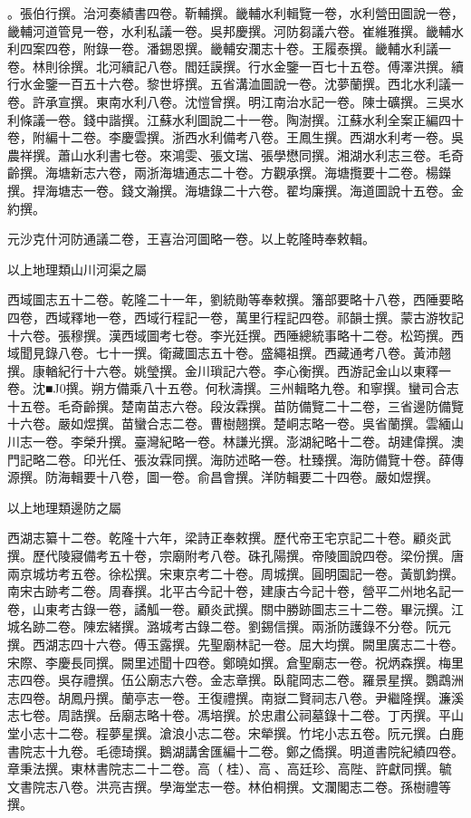\begin{pinyinscope}
。張伯行撰。治河奏績書四卷。靳輔撰。畿輔水利輯覽一卷，水利營田圖說一卷，畿輔河道管見一卷，水利私議一卷。吳邦慶撰。河防芻議六卷。崔維雅撰。畿輔水利四案四卷，附錄一卷。潘錫恩撰。畿輔安瀾志十卷。王履泰撰。畿輔水利議一卷。林則徐撰。北河續記八卷。閻廷謨撰。行水金鑒一百七十五卷。傅澤洪撰。續行水金鑒一百五十六卷。黎世垿撰。五省溝洫圖說一卷。沈夢蘭撰。西北水利議一卷。許承宣撰。東南水利八卷。沈愷曾撰。明江南治水記一卷。陳士礦撰。三吳水利條議一卷。錢中諧撰。江蘇水利圖說二十一卷。陶澍撰。江蘇水利全案正編四十卷，附編十二卷。李慶雲撰。浙西水利備考八卷。王鳳生撰。西湖水利考一卷。吳農祥撰。蕭山水利書七卷。來鴻雯、張文瑞、張學懋同撰。湘湖水利志三卷。毛奇齡撰。海塘新志六卷，兩浙海塘通志二十卷。方觀承撰。海塘攬要十二卷。楊鑅撰。捍海塘志一卷。錢文瀚撰。海塘錄二十六卷。翟均廉撰。海道圖說十五卷。金約撰。

元沙克什河防通議二卷，王喜治河圖略一卷。以上乾隆時奉敕輯。

以上地理類山川河渠之屬

西域圖志五十二卷。乾隆二十一年，劉統勛等奉敕撰。籓部要略十八卷，西陲要略四卷，西域釋地一卷，西域行程記一卷，萬里行程記四卷。祁韻士撰。蒙古游牧記十六卷。張穆撰。漢西域圖考七卷。李光廷撰。西陲總統事略十二卷。松筠撰。西域聞見錄八卷。七十一撰。衛藏圖志五十卷。盛繩祖撰。西藏通考八卷。黃沛翹撰。康輶紀行十六卷。姚瑩撰。金川瑣記六卷。李心衡撰。西游記金山以東釋一卷。沈■J0撰。朔方備乘八十五卷。何秋濤撰。三州輯略九卷。和寧撰。蠻司合志十五卷。毛奇齡撰。楚南苗志六卷。段汝霖撰。苗防備覽二十二卷，三省邊防備覽十六卷。嚴如煜撰。苗蠻合志二卷。曹樹翹撰。楚峒志略一卷。吳省蘭撰。雲緬山川志一卷。李榮升撰。臺灣紀略一卷。林謙光撰。澎湖紀略十二卷。胡建偉撰。澳門記略二卷。印光任、張汝霖同撰。海防述略一卷。杜臻撰。海防備覽十卷。薛傳源撰。防海輯要十八卷，圖一卷。俞昌會撰。洋防輯要二十四卷。嚴如煜撰。

以上地理類邊防之屬

西湖志纂十二卷。乾隆十六年，梁詩正奉敕撰。歷代帝王宅京記二十卷。顧炎武撰。歷代陵寢備考五十卷，宗廟附考八卷。硃孔陽撰。帝陵圖說四卷。梁份撰。唐兩京城坊考五卷。徐松撰。宋東京考二十卷。周城撰。圓明園記一卷。黃凱鈞撰。南宋古跡考二卷。周春撰。北平古今記十卷，建康古今記十卷，營平二州地名記一卷，山東考古錄一卷，譎觚一卷。顧炎武撰。關中勝跡圖志三十二卷。畢沅撰。江城名跡二卷。陳宏緒撰。潞城考古錄二卷。劉錫信撰。兩浙防護錄不分卷。阮元撰。西湖志四十六卷。傅玉露撰。先聖廟林記一卷。屈大均撰。闕里廣志二十卷。宋際、李慶長同撰。闕里述聞十四卷。鄭曉如撰。倉聖廟志一卷。祝炳森撰。梅里志四卷。吳存禮撰。伍公廟志六卷。金志章撰。臥龍岡志二卷。羅景星撰。鸚鵡洲志四卷。胡鳳丹撰。蘭亭志一卷。王復禮撰。南嶽二賢祠志八卷。尹繼隆撰。濂溪志七卷。周誥撰。岳廟志略十卷。馮培撰。於忠肅公祠墓錄十二卷。丁丙撰。平山堂小志十二卷。程夢星撰。滄浪小志二卷。宋犖撰。竹垞小志五卷。阮元撰。白鹿書院志十九卷。毛德琦撰。鵝湖講舍匯編十二卷。鄭之僑撰。明道書院紀績四卷。章秉法撰。東林書院志二十二卷。高（桂）、高、高廷珍、高陛、許獻同撰。毓文書院志八卷。洪亮吉撰。學海堂志一卷。林伯桐撰。文瀾閣志二卷。孫樹禮等撰。


\end{pinyinscope}
